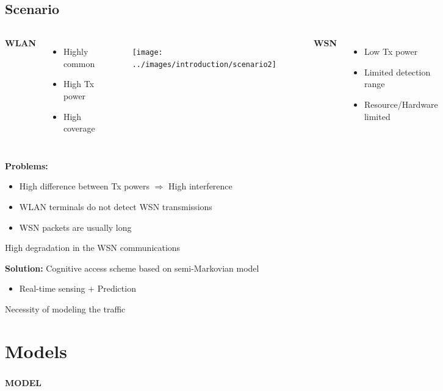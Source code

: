 \documentclass[9pt,handout,serif]{beamer}
\begin{document}
\subsection{Scenario}
\begin{frame}[c]
	\begin{columns}
		\textbf{WLAN}
		\begin{itemize}
			\item Highly common
			\item High Tx power
			\item High coverage
		\end{itemize}
		\begin{figure}
			\texttt{[image: ../images/introduction/scenario2]}
		\end{figure}
		\textbf{WSN}
		\begin{itemize}
			\item Low Tx power
			\item Limited detection range
			\item Resource/Hardware limited
		\end{itemize}
	\end{columns}
	
	\vspace{0.2in}
	
	\textbf{Problems:}
	\begin{itemize}
		\item High difference between Tx powers $\Rightarrow$ High interference
		\item WLAN terminals do not detect WSN transmissions
		\item WSN packets are usually long
	\end{itemize}
	\begin{center}
		High degradation in the WSN communications
	\end{center}
	\textbf{Solution:} Cognitive access scheme based on semi-Markovian model
	\begin{itemize}
		\item Real-time sensing + Prediction
	\end{itemize}
	\begin{center}
		Necessity of modeling the traffic
	\end{center}
\end{frame}

\section{Models}
\begin{frame}[c]
	\frametitle{}
	\begin{center}
		\textbf{\Huge{MODEL}}
	\end{center}
\end{frame}
\end{document}
